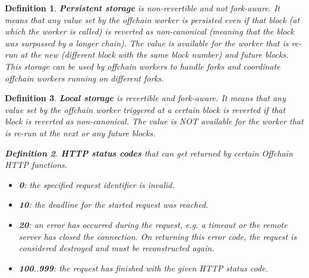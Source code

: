\documentclass{book}
\newcommand{\tmstrong}[1]{\textbf{#1}}
\newcommand{\tmverbatim}[1]{{\ttfamily{#1}}}
\newenvironment{itemizedot}{\begin{itemize} \renewcommand{\labelitemi}{$\bullet$}\renewcommand{\labelitemii}{$\bullet$}\renewcommand{\labelitemiii}{$\bullet$}\renewcommand{\labelitemiv}{$\bullet$}}{\end{itemize}}
\newtheorem{definition}{Definition}
\newtheorem{definition}{Definition}
\begin{document}
\begin{definition}
  \label{defn-offchain-persistent-storage}{\tmstrong{Persistent
  {\tmstrong{storage}}}} is non-revertible and not fork-aware. It means that
  any value set by the offchain worker is persisted even if that block (at
  which the worker is called) is reverted as non-canonical (meaning that the
  block was surpassed by a longer chain). The value is available for the
  worker that is re-run at the new (different block with the same block
  number) and future blocks. This storage can be used by offchain workers to
  handle forks and coordinate offchain workers running on different forks.
\end{definition}

\begin{definition}
  \label{defn-offchain-local-storage}{\tmstrong{Local storage}} is revertible
  and fork-aware. It means that any value set by the offchain worker triggered
  at a certain block is reverted if that block is reverted as non-canonical.
  The value is NOT available for the worker that is re-run at the next or any
  future blocks.
  
  \begin{definition}
    \label{defn-http-return-value}{\tmstrong{HTTP status codes}} that can get
    returned by certain Offchain HTTP functions.
    \begin{itemizedot}
      \item {\tmstrong{0}}: the specified request identifier is invalid.
      
      \item {\tmstrong{10}}: the deadline for the started request was reached.
      
      \item {\tmstrong{20}}: an error has occurred during the request, e.g. a
      timeout or the remote server has closed the connection. On returning
      this error code, the request is considered destroyed and must be
      reconstructed again.
      
      \item {\tmstrong{100}}..{\tmstrong{999}}: the request has finished with
      the given HTTP status code.
    \end{itemizedot}
  \end{definition}
  
  \ 
\end{definition}

\subsubsection{\tmverbatim{ext\_is\_validator}}
\end{document}
